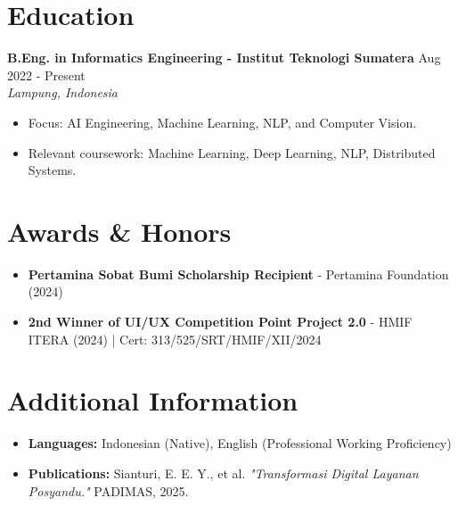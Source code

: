 \documentclass[11pt,a4paper]{article}
\newcommand{\resumeSubheading}[4]{%
  \textbf{#1} \hfill #2 \\
  \textit{#3} \hfill \textit{#4}
}
\begin{document}
\section*{Education}
\resumeSubheading{B.Eng. in Informatics Engineering - Institut Teknologi Sumatera}{Aug 2022 - Present}{Lampung, Indonesia}{}
\begin{itemize}
  \item Focus: AI Engineering, Machine Learning, NLP, and Computer Vision.
  \item Relevant coursework: Machine Learning, Deep Learning, NLP, Distributed Systems.
\end{itemize}

\section*{Awards \& Honors}
\begin{itemize}
  \item \textbf{Pertamina Sobat Bumi Scholarship Recipient} - Pertamina Foundation (2024)
  \item \textbf{2nd Winner of UI/UX Competition Point Project 2.0} - HMIF ITERA (2024) | Cert: 313/525/SRT/HMIF/XII/2024
\end{itemize}

\section*{Additional Information}
\begin{itemize}
  \item \textbf{Languages:} Indonesian (Native), English (Professional Working Proficiency)
  \item \textbf{Publications:} Sianturi, E. E. Y., et al. \textit{"Transformasi Digital Layanan Posyandu."} PADIMAS, 2025.
\end{itemize}
\end{document}
